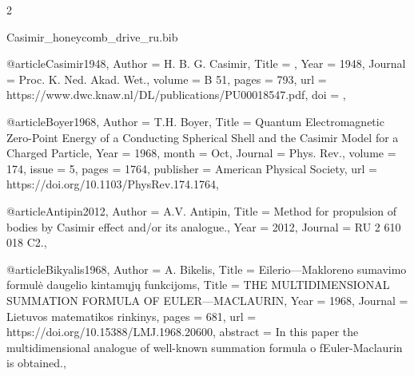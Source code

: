 \documentclass[twoside, 10pt]{article}
\def\myfilename{Casimir_honeycomb_drive_ru}
\begin{document}
\begin{multicols}{2}

\begin{filecontents}{\myfilename.bib}


@article{Casimir1948,
    Author = {H. B. G. Casimir},
    Title = {},
    Year = {1948},
    Journal = {Proc. K. Ned. Akad. Wet.},
    volume = {B 51},
    pages = {793},
    url = {https://www.dwc.knaw.nl/DL/publications/PU00018547.pdf},
    doi = {},
}


@article{Boyer1968,
    Author = {T.H. Boyer},
    Title = {Quantum Electromagnetic Zero-Point Energy of a Conducting Spherical Shell and the Casimir Model for a Charged Particle},
    Year = {1968},
    month = {Oct},
    Journal = {Phys. Rev.},
    volume = {174},
    issue = {5},
    pages = {1764},
    publisher = {American Physical Society},
    url = {https://doi.org/10.1103/PhysRev.174.1764},
}


@article{Antipin2012,
    Author = {A.V. Antipin},
    Title = {Method for propulsion of bodies by Casimir effect and/or its analogue.},
    Year = {2012},
    Journal = {RU 2 610 018 C2.},
}


@article{Bikyalis1968,
    Author = {A. Bikelis},
    Title = {Eilerio—Makloreno sumavimo formulė daugelio kintamųjų funkcijoms},
    Title = {THE MULTIDIMENSIONAL SUMMATION FORMULA OF EULER—MACLAURIN},
    Year = {1968},
    Journal = {Lietuvos matematikos rinkinys},
    pages = {681},
    url = {https://doi.org/10.15388/LMJ.1968.20600},
    abstract = {In this paper the multidimensional analogue of well-known summation formula o fEuler-Maclaurin is obtained.},
}


\end{filecontents}
\end{multicols}
\end{document}
